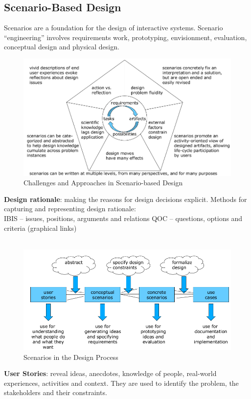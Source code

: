 \subsection{Scenario-Based Design}
Scenarios are a foundation for the design of interactive systems. Scenario ``engineering'' involves requirements work, prototyping, envisionment, evaluation, conceptual design and physical design.
\begin{figure}[h!]
	\centering
	\includegraphics[width=.8\textwidth]{img/ch06_scene.png}
	\caption{Challenges and Approaches in Scenario-based Design}
	\label{scen}
\end{figure}
\textbf{Design rationale}: making the reasons for design decisions explicit. Methods for capturing and representing design rationale:\\
IBIS – issues, positions, arguments and relations
QOC – questions, options and criteria (graphical links)\\\\
\begin{figure}[h!]
	\centering
	\includegraphics[width=.8\textwidth]{img/ch06_scene1.png}
	\caption{Scenarios in the Design Process}
	\label{scen1}
\end{figure}
\textbf{User Stories}: reveal ideas, anecdotes, knowledge of people, real-world experiences, activities and context. They are used to identify the problem, the stakeholders and their constraints.\\\\

